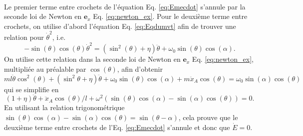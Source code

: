 \documentclass[11pt,a4paper]{exam}
\newcommand{\exACDH}{\bm e_x}
\begin{document}
\begin{parts}
\begin{align}
        \label{eq:Emecdot}
    \end{align}
    Le premier terme entre crochets de l'équation Eq. \eqref{eq:Emecdot} s'annule par la seconde loi de Newton en $\exACDH$ Eq. \eqref{eq:newton_ex}.
    Pour le deuxième terme entre crochets, on utilise d'abord l'équation Eq. \eqref{eq:Eqdumvt} afin de trouver une relation pour $\dot\theta^2$, i.e.
    $$
    -\sin(\theta)\cos(\theta)\dot\theta^2 = (\sin^2(\theta)+\eta)\ddot\theta + \omega_0\sin(\theta)\cos(\alpha).
    $$
    On utilise cette relation dans la seconde loi de Newton en $\exACDH$ Eq. \eqref{eq:newton_ex}, multipliée au préalable par $\cos(\theta)$, afin d'obtenir
    $$
    ml\ddot\theta \cos^2(\theta) + (\sin^2\theta+\eta)\ddot\theta + \omega_0\sin(\theta)\cos(\alpha) + m \ddot x_A \cos(\theta) = \omega_0 \sin(\alpha)\cos(\theta) 
    $$
    qui se simplifie en 
    $$
    (1+\eta)\ddot\theta + \ddot x_A \cos(\theta)/l + \omega^2 (\sin(\theta)\cos(\alpha) - \sin(\alpha)\cos(\theta)) = 0.
    $$
    En utilisant la relation trigonométrique $\sin(\theta)\cos(\alpha) - \sin(\alpha)\cos(\theta)=\sin(\theta-\alpha)$, cela prouve que le deuxième terme entre crochets de l'Eq. \eqref{eq:Emecdot} s'annule et donc que $\dot E = 0$.

\end{parts}
\end{document}
